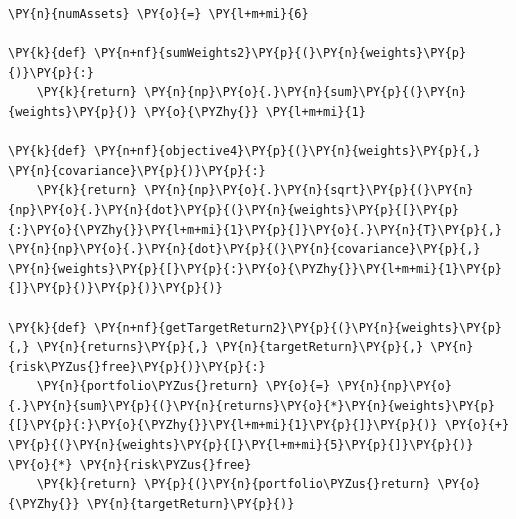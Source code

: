     \begin{tcolorbox}[breakable, size=fbox, boxrule=1pt, pad at break*=1mm,colback=cellbackground, colframe=cellborder]
\begin{Verbatim}[commandchars=\\\{\}]
\PY{n}{numAssets} \PY{o}{=} \PY{l+m+mi}{6}

\PY{k}{def} \PY{n+nf}{sumWeights2}\PY{p}{(}\PY{n}{weights}\PY{p}{)}\PY{p}{:}
    \PY{k}{return} \PY{n}{np}\PY{o}{.}\PY{n}{sum}\PY{p}{(}\PY{n}{weights}\PY{p}{)} \PY{o}{\PYZhy{}} \PY{l+m+mi}{1}

\PY{k}{def} \PY{n+nf}{objective4}\PY{p}{(}\PY{n}{weights}\PY{p}{,} \PY{n}{covariance}\PY{p}{)}\PY{p}{:}
    \PY{k}{return} \PY{n}{np}\PY{o}{.}\PY{n}{sqrt}\PY{p}{(}\PY{n}{np}\PY{o}{.}\PY{n}{dot}\PY{p}{(}\PY{n}{weights}\PY{p}{[}\PY{p}{:}\PY{o}{\PYZhy{}}\PY{l+m+mi}{1}\PY{p}{]}\PY{o}{.}\PY{n}{T}\PY{p}{,} \PY{n}{np}\PY{o}{.}\PY{n}{dot}\PY{p}{(}\PY{n}{covariance}\PY{p}{,} \PY{n}{weights}\PY{p}{[}\PY{p}{:}\PY{o}{\PYZhy{}}\PY{l+m+mi}{1}\PY{p}{]}\PY{p}{)}\PY{p}{)}\PY{p}{)}

\PY{k}{def} \PY{n+nf}{getTargetReturn2}\PY{p}{(}\PY{n}{weights}\PY{p}{,} \PY{n}{returns}\PY{p}{,} \PY{n}{targetReturn}\PY{p}{,} \PY{n}{risk\PYZus{}free}\PY{p}{)}\PY{p}{:}
    \PY{n}{portfolio\PYZus{}return} \PY{o}{=} \PY{n}{np}\PY{o}{.}\PY{n}{sum}\PY{p}{(}\PY{n}{returns}\PY{o}{*}\PY{n}{weights}\PY{p}{[}\PY{p}{:}\PY{o}{\PYZhy{}}\PY{l+m+mi}{1}\PY{p}{]}\PY{p}{)} \PY{o}{+} \PY{p}{(}\PY{n}{weights}\PY{p}{[}\PY{l+m+mi}{5}\PY{p}{]}\PY{p}{)} \PY{o}{*} \PY{n}{risk\PYZus{}free}
    \PY{k}{return} \PY{p}{(}\PY{n}{portfolio\PYZus{}return} \PY{o}{\PYZhy{}} \PY{n}{targetReturn}\PY{p}{)}


\end{Verbatim}
\end{tcolorbox}
